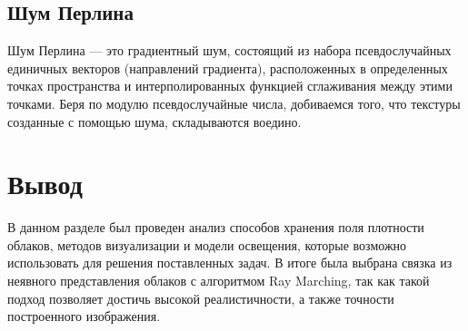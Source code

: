 \subsection{Шум Перлина}

Шум Перлина — это градиентный шум, состоящий из набора псевдослучайных единичных векторов (направлений градиента), расположенных в определенных точках пространства и интерполированных функцией сглаживания между этими точками. Беря по модулю псевдослучайные числа, добиваемся того, что текстуры созданные с помощью шума, складываются воедино. 


	
	
\section*{Вывод}

В данном разделе был проведен анализ способов хранения поля плотности облаков, методов визуализации и модели освещения, которые возможно использовать для решения поставленных задач. В итоге была выбрана связка из неявного представления облаков с алгоритмом Ray Marching, так как такой подход позволяет достичь высокой реалистичности, а также точности построенного изображения. 








